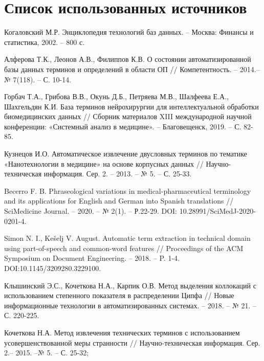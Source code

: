 \section*{Список использованных источников}

\begingroup
\renewcommand{\section}[2]{}
\begin{thebibliography}{}
	
	Когаловский М.Р. Энциклопедия технологий баз данных. – Москва: Финансы и статистика, 2002. – 800 с.
	
	Алферова Т.К., Леонов А.В., Филиппов К.В. О состоянии автоматизированной базы данных терминов и определений в области ОП // Компетентность. – 2014.– № 7(118). – С. 10-14.
	
	Горбач Т.А., Грибова В.В., Окунь Д.Б., Петряева М.В., Шалфеева Е.А., Шахгельдян К.И. База терминов нейрохирургии для интеллектуальной обработки биомедицинских данных // Сборник материалов XIII международной научной конференции: «Системный анализ в медицине». – Благовещенск, 2019. – С. 82-85.
	
	Кузнецов И.О. Автоматическое извлечение двусловных терминов по тематике «Нанотехнологии в медицине» на основе корпусных данных // Научно-техническая информация. Сер. 2. – 2013. – № 5. – С. 25-33.
	
	Becerro F. B. Phraseological variations in medical-pharmaceutical terminology and its applications for English and German into Spanish translations // SciMedicine Journal. – 2020. – № 2(1). – Р.22-29. DOI: 10.28991/SciMedJ-2020-0201-4.
	
	Simon N. I., Kešelj V. August. Automatic term extraction in technical domain using part-of-speech and common-word features // Proceedings of the ACM Symposium on Document Engineering. – 2018. – P. 1-4. DOI:10.1145/3209280.3229100.
	
	Клышинский Э.С., Кочеткова Н.А., Карпик О.В. Метод выделения коллокаций с использованием степенного показателя в распределении Ципфа // Новые информационные технологии в автоматизированных системах. – 2018. – № 21. – С. 220-225.
	
	Кочеткова Н.А. Метод извлечения технических терминов с использованием усовершенствованной меры странности // Научно-техническая информация. Сер. 2.– 2015. –№ 5. – С. 25-32;
	

\end{thebibliography}
